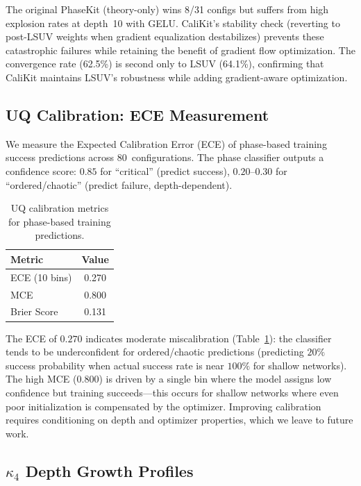 \documentclass[10pt]{article}
\begin{document}
The original PhaseKit (theory-only) wins 8/31 configs but suffers from high explosion rates at depth~10 with GELU.
CaliKit's stability check (reverting to post-LSUV weights when gradient equalization destabilizes) prevents these catastrophic failures while retaining the benefit of gradient flow optimization.
The convergence rate (62.5\%) is second only to LSUV (64.1\%), confirming that CaliKit maintains LSUV's robustness while adding gradient-aware optimization.

\subsection{UQ Calibration: ECE Measurement}
\label{sec:uq-calibration}

We measure the Expected Calibration Error (ECE) of phase-based training success predictions across 80~configurations.
The phase classifier outputs a confidence score: $0.85$ for ``critical'' (predict success), $0.20$--$0.30$ for ``ordered/chaotic'' (predict failure, depth-dependent).

\begin{table}[t]
\centering
\caption{UQ calibration metrics for phase-based training predictions.}
\label{tab:uq-calibration}
\small
\begin{tabular}{@{}lc@{}}
\toprule
\textbf{Metric} & \textbf{Value} \\
\midrule
ECE (10 bins)  & 0.270 \\
MCE            & 0.800 \\
Brier Score    & 0.131 \\
\bottomrule
\end{tabular}
\end{table}

The ECE of $0.270$ indicates moderate miscalibration (Table~\ref{tab:uq-calibration}): the classifier tends to be underconfident for ordered/chaotic predictions (predicting $20\%$ success probability when actual success rate is near $100\%$ for shallow networks).
The high MCE ($0.800$) is driven by a single bin where the model assigns low confidence but training succeeds---this occurs for shallow networks where even poor initialization is compensated by the optimizer.
Improving calibration requires conditioning on depth and optimizer properties, which we leave to future work.

\subsection{$\kappa_4$ Depth Growth Profiles}
\end{document}
